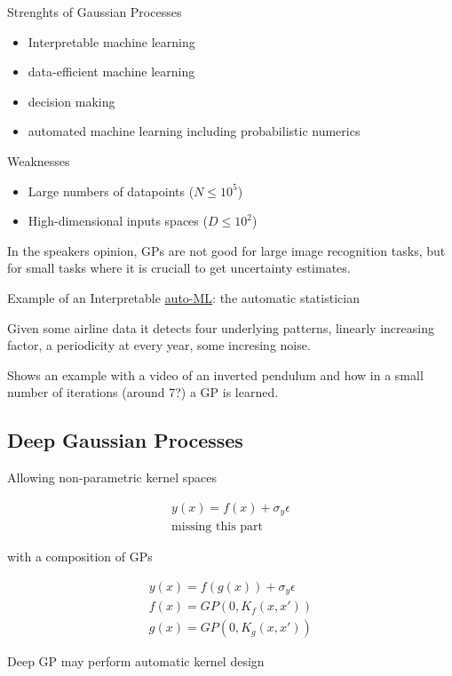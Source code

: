 \documentclass[b5paper]{report}
\begin{document}
Strenghts of Gaussian Processes

\begin{itemize}
  \item Interpretable machine learning
  \item data-efficient machine learning
  \item decision making
  \item automated machine learning including probabilistic numerics
\end{itemize}

Weaknesses

\begin{itemize}
  \item Large numbers of datapoints ($N \le 10^5$)
  \item High-dimensional inputs spaces ($D \le 10^2$)
\end{itemize}

In the speakers opinion, GPs are not good for large image recognition tasks,
but for small tasks where it is cruciall to get uncertainty estimates.

Example of an Interpretable \href{https://cloud.google.com/automl/}{auto-ML}: the automatic statistician

Given some airline data it detects four underlying patterns, linearly
increasing factor, a periodicity at every year, some incresing noise.

Shows an example with a video of an inverted pendulum and how in a small number
of iterations (around 7?) a GP is learned.

\subsection{Deep Gaussian Processes}

Allowing non-parametric kernel spaces

\begin{align}
  y(x) = f(x) + \sigma_y \epsilon \\
  \text{missing this part}
\end{align}

with a composition of GPs

\begin{align}
  y(x) = f(g(x)) + \sigma_y \epsilon \\
  f(x) = GP(0, K_f(x,x')) \\
  g(x) = GP(0,K_g(x,x'))
\end{align}

Deep GP may perform automatic kernel design
\end{document}
